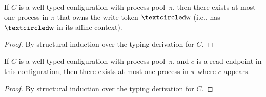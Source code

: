 
\begin{lemma}
\label{lem:UniqueWriter}
If $C$ is a well-typed configuration with process pool~$\pi$, then there exists at
most one process in $\pi$ that owns the write token $\wrtok$ (i.e., has $\wrtok$
in its affine context).
\begin{proof}
By structural induction over the typing derivation for $C$.
\end{proof}
\end{lemma}

\begin{lemma}
\label{lem:UniqueReader}
If $C$ is a well-typed configuration with process pool~$\pi$, 
and $c$ is a read endpoint in this configuration,
then there exists at most one process in $\pi$ where $c$ appears.
\begin{proof}
By structural induction over the typing derivation for $C$.
\end{proof}
\end{lemma}

